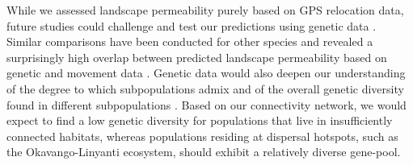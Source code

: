 \documentclass[abstract=on,10pt,a4paper,bibliography=totocnumbered]{scrartcl}
\begin{document}

While we assessed landscape permeability purely based on GPS relocation
data, future studies could challenge and test our predictions using genetic data
\citep{Spear.2010}. Similar comparisons have been conducted for other species
and revealed a surprisingly high overlap between predicted landscape
permeability based on genetic and movement data \citep{Cushman.2010}. Genetic
data would also deepen our understanding of the degree to which subpopulations
admix and of the overall genetic diversity found in different subpopulations
\citep{Girman.2001}. Based on our connectivity network, we would expect to find
a low genetic diversity for populations that live in insufficiently connected
habitats, whereas populations residing at dispersal hotspots, such as the
Okavango-Linyanti ecosystem, should exhibit a relatively diverse gene-pool.
\end{document}
